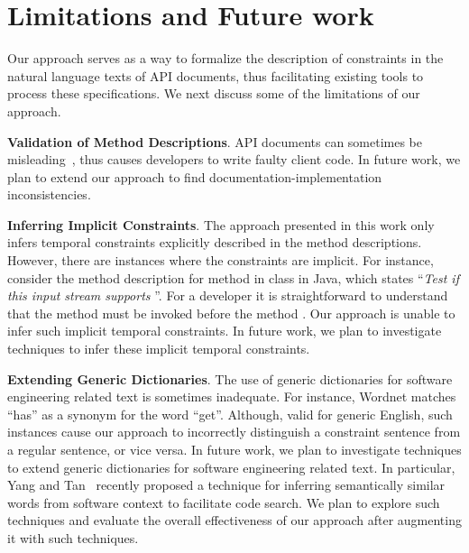 \section{Limitations and Future work}
\label{sec:discussion}

Our approach serves as a way to formalize the description of constraints in the natural language texts of API documents, thus facilitating existing tools to process these specifications. We next discuss some of the limitations of our approach.

\textbf{Validation of Method Descriptions}. API documents can sometimes be misleading~\cite{tcomment,Cindy10:PASTE}, thus causes developers to write faulty client code. In future work, we plan to extend our approach to find documentation-implementation inconsistencies.

\textbf{Inferring Implicit Constraints}. The approach presented in this work only infers temporal constraints explicitly described in the method descriptions.
However, there are instances where the constraints are implicit. For instance, consider the method description for  method in  class in Java, which states ``\textit{Test if this input stream supports }''. For a developer it is straightforward to understand that the method  must be invoked before the method . Our approach is unable to infer such implicit temporal constraints. In future work, we plan to investigate techniques to infer these implicit temporal constraints.

\textbf{Extending Generic Dictionaries}. The use of generic dictionaries for software engineering related text is sometimes inadequate. For instance, Wordnet matches ``has'' as a synonym for the word ``get''. Although, valid for generic English, such instances cause our approach to incorrectly distinguish a constraint sentence from a regular sentence, or vice versa. In future work, we plan to investigate techniques to extend generic dictionaries for software engineering related text. In particular, Yang and Tan~\cite{swordnet} recently proposed a technique for inferring semantically similar words from software context to facilitate code search. We plan to explore such techniques and evaluate the overall effectiveness of our approach after augmenting it with such techniques.  

